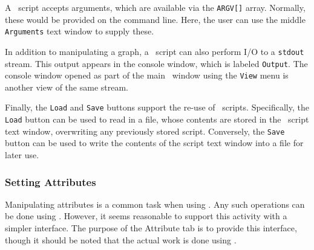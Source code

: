 A \gvpr\ script accepts arguments, which are available via the {\tt ARGV[]} array. Normally, these
would be provided on the command line. Here, the user can use the middle {\tt Arguments} text
window to supply these.

In addition to manipulating a graph, a \gvpr\ script can also perform I/O to a {\tt stdout} stream. 
This output appears
in the console window, which is labeled {\tt Output}. The console window opened as part of the
main \smyrna\ window using the {\tt View} menu is another view of the same stream.  

Finally, the {\tt Load} and {\tt Save} buttons support the re-use of \gvpr\ scripts.
Specifically, the {\tt Load} button can be used to read in a file, whose contents are stored 
in the \gvpr\ script text window, overwriting any previously stored script. Conversely, the
{\tt Save} button can be used to write the contents of the script text window into a file
for later use.

\subsubsection{Setting Attributes}
\label{sec:attr}
Manipulating attributes is a common task when using \smyrna. Any such operations can be done
using \gvpr. However, it seems reasonable to support this activity with a simpler interface.
The purpose of the Attribute tab is to provide this interface, though it should be noted that
the actual work is done using \gvpr.

